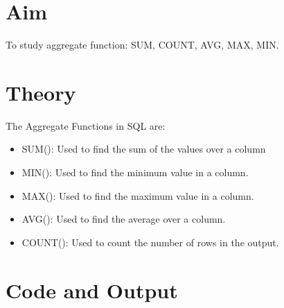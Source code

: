 \section{Aim}
 To study aggregate function: SUM, COUNT, AVG, MAX, MIN.

\section{{Theory}}

The Aggregate Functions in SQL are: 
\begin{itemize}
	\item SUM(): Used to find the sum of the values over a column
	\item MIN(): Used to find the minimum value in a column.
	\item MAX(): Used to find the maximum value in a column.
	\item AVG(): Used to find the average over a column.
	\item COUNT(): Used to count the number of rows in the output.
\end{itemize}

\section{{Code and Output}}

